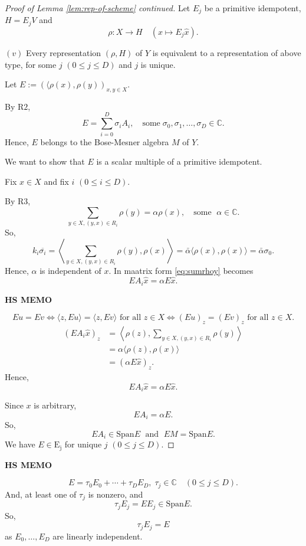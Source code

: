 \documentclass[
]{book}
\theoremstyle{definition}
\theoremstyle{definition}
\theoremstyle{definition}
\theoremstyle{definition}
\theoremstyle{remark}
\begin{document}
\begin{proof}[Proof of Lemma \ref{lem:rep-of-scheme} continued]
Let \(E_j\) be a primitive idempotent, \(H = E_jV\) and
\[\rho: X\to H \quad (x\mapsto E_j\hat{x}).\]

\((v)\) Every representation \((\rho, H)\) of \(Y\) is equivalent to a representation of above type, for some \(j\) \((0\leq j\leq D)\) and \(j\) is unique.

Let \(E:=(\langle \rho(x), \rho(y))_{x,y\in X}\).

By \(\mathrm{R2}\),
\[E = \sum_{i = 0}^D \sigma_i A_i, \quad \text{some}\; \sigma_0, \sigma_1, \ldots, \sigma_D\in \mathbb{C}.\]
Hence, \(E\) belongs to the Bose-Mesner algebra \(M\) of \(Y\).

We want to show that \(E\) is a scalar multiple of a primitive idempotent.

Fix \(x\in X\) and fix \(i\) \((0\leq i\leq D)\).

By \(\mathrm{R3}\),
\begin{equation}
\sum_{y\in X, (y,x)\in R_i}\rho(y) = \alpha \rho(x), \quad \text{some }\; \alpha\in \mathbb{C}. \label{eq:sumrhoy}
\end{equation}
So,
\[k_i\overline{\sigma_i} = \left\langle \sum_{y\in X, (y,x)\in R_i}\rho(y),\rho(x)\right\rangle = \bar{\alpha}\langle \rho(x), \rho(x)\rangle = \bar{\alpha}\sigma_0.\]
Hence, \(\alpha\) is independent of \(x\). In maatrix form \eqref{eq:sumrhoy} becomes
\[EA_i\hat{x} = \alpha E\hat{x}.\]

\textbf{HS MEMO}

\[Eu = Ev \Leftrightarrow \langle z, Eu\rangle = \langle z, Ev\rangle \text{ for all }z\in X \Leftrightarrow (Eu)_z = (Ev)_z \text{ for all }z\in X.\]
\begin{align}
(EA_i\hat{x})_z & = \left\langle \rho(z), \sum_{y\in X, (y,x)\in R_i}\rho(y)\right\rangle\\
& = \alpha \langle \rho(z), \rho(x)\rangle\\
& = (\alpha E\hat{x})_z.
\end{align}
Hence,
\[EA_i\hat{x} = \alpha E\hat{x}.\]

Since \(x\) is arbitrary,
\[EA_i = \alpha E.\]
So,
\[EA_i \in \mathrm{Span} E\; \text{ and }\; EM = \mathrm{Span} E.\]
We have \(E\in \mathrm{E_j}\) for unique \(j\) \((0\leq j\leq D)\).
\end{proof}

\textbf{HS MEMO}

\[E = \tau_0 E_0 + \cdots + \tau_D E_D, \; \tau_j\in \mathbb{C}\quad (0\leq j\leq D).\]
And, at least one of \(\tau_j\) is nonzero, and
\[\tau_jE_j = EE_j \in \mathrm{Span}E.\]
So,
\[\tau_jE_j = E\]
as \(E_0, \ldots, E_D\) are linearly independent.
\end{document}
